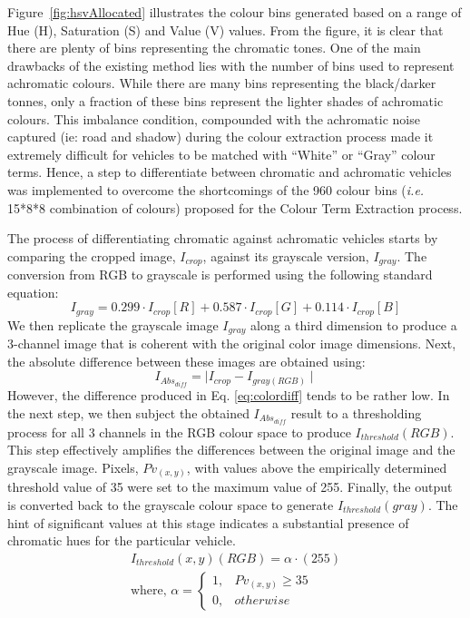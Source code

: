 Figure~\ref{fig:hsvAllocated} illustrates the colour bins generated based on a range of Hue (H), Saturation (S) and Value (V) values. From the figure, it is clear that there are plenty of bins representing the chromatic tones.
One of the main drawbacks of the existing method lies with the number of bins used to represent achromatic colours.
While there are many bins representing the black/darker tonnes, only a fraction of these bins represent the lighter shades of achromatic colours. This imbalance condition, compounded with the achromatic noise captured (ie: road and shadow) during the colour extraction process made it extremely difficult for vehicles to be matched with ``White'' or ``Gray'' colour terms.
Hence, a step to differentiate between chromatic and achromatic vehicles was implemented to overcome the shortcomings of the 960 colour bins (\emph{i.e.} 15*8*8 combination of colours) proposed for the Colour Term Extraction process. %

The process of differentiating chromatic against achromatic vehicles starts by comparing the cropped image, $I_{crop}$, against its grayscale version, $I_{gray}$.
The conversion from RGB to grayscale is performed using the following standard equation:
\begin{equation}
I_{gray} = 0.299 \cdot I_{crop}[R]+0.587 \cdot I_{crop}[G]+0.114 \cdot I_{crop}[B]
\label{eq:rgb2gray}
\end{equation}
We then replicate the grayscale image $I_{gray}$ along a third dimension to produce a 3-channel image that is coherent with the original color image dimensions.
Next, the absolute difference between these images are obtained using: 
\begin{equation}
    I_{Abs_{diff}} = \mid I_{crop} - I_{gray(RGB)} \mid
\label{eq:colordiff}
\end{equation}
However, the difference produced in Eq. \ref{eq:colordiff} tends to be rather low. In the next step, we then subject the obtained $I_{Abs_{diff}}$ result to a thresholding process for all 3 channels in the RGB colour space to produce $I_{threshold}(RGB)$.
This step effectively amplifies the differences between the original image and the grayscale image. Pixels, $Pv_{(x,y)}$, with values above the empirically determined threshold value of 35 were set to the maximum value of 255.
Finally, the output %
is converted back to the grayscale colour space to generate $I_{threshold}(gray)$. The hint of significant values at this stage indicates a substantial presence of chromatic hues for the particular vehicle.
\begin{align*}
\label{eq:threshabsolutediff}
I_{threshold}(x,y)(RGB) = \alpha \cdot (255) \\
\text{where, }
\alpha =
\begin{cases}
1, & Pv_{(x,y)} \geq 35\\
0, & otherwise
\end{cases}
\end{align*}

